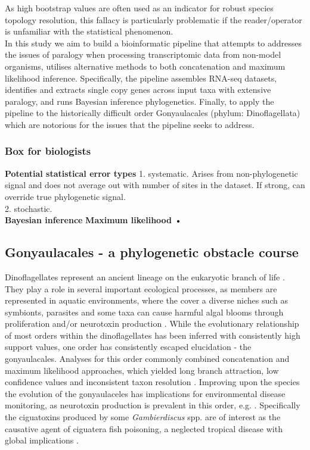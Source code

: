 \documentclass[12pt]{article}
\begin{document}
As high bootstrap values are often used as an indicator for robust species topology resolution, this fallacy is particularly problematic if the reader/operator is unfamiliar with the statistical phenomenon.\\
In this study we aim to build a bioinformatic pipeline that attempts to addresses the issues of paralogy when processing transcriptomic data from non-model organisms, utilises alternative methods to both concatenation and maximum likelihood inference. 
Specifically, the pipeline assembles RNA-seq datasets, identifies and extracts single copy genes across input taxa with extensive paralogy, and runs Bayesian inference phylogenetics. 
Finally, to apply the pipeline to the historically difficult order Gonyaulacales (phylum: Dinoflagellata) which are notorious for the issues that the pipeline seeks to address.\\

\subsubsection*{Box for biologists}
\textbf{Potential statistical error types}
1. systematic. Arises from non-phylogenetic signal and does not average out with number of sites in the dataset. If strong, can override true phylogenetic signal.\\
2. stochastic.\\
\textbf{Bayesian inference}
\textbf{Maximum likelihood}
\textbf{•}

\subsection*{Gonyaulacales - a phylogenetic obstacle course}
Dinoflagellates represent an ancient lineage on the eukaryotic branch of life \cite{moldowan1998biogeochemical}. 
They play a role in several important ecological processes, as members are represented in aquatic environments, where the cover a diverse niches such as symbionts, parasites and some taxa can cause harmful algal blooms through proliferation and/or neurotoxin production \cite{murray2016unravelling}.
While the evolutionary relationship of most orders within the dinoflagellates has been inferred with consistently high support values, one order has consistently escaped elucidation - the gonyaulacales. 
Analyses for this order commonly combined concatenation and maximum likelihood approaches, which yielded long branch attraction, low confidence values and inconsistent taxon resolution \cite{}. 
Improving upon the species the evolution of the gonyaulaceles has implications for environmental disease monitoring, as neurotoxin production is prevalent in this order, e.g. \cite{shalchian2006combined,zhang2007three,saldarriaga2004molecular,hoppenrath2010dinoflagellate,murray2005improving}. 
Specifically the ciguatoxins produced by some \emph{Gambierdiscus} spp. are of interest as the causative agent of ciguatera fish poisoning, a neglected tropical disease with global implications \cite{globalcig}.%
\end{document}

